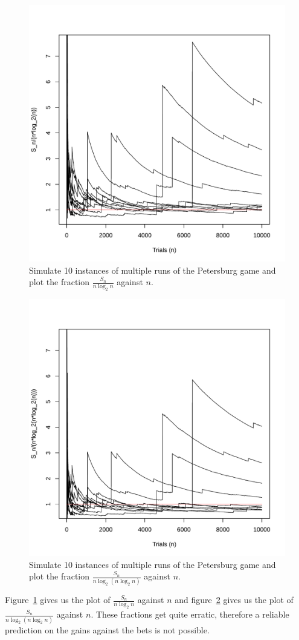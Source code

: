 \documentclass[twoside,a4paper]{article}
\theoremstyle{plain}
\theoremstyle{definition}
\theoremstyle{remark}
\numberwithin{equation}{section}
\DeclareMathOperator{\1}{\mathbbm{1}}
\begin{document}
\begin{figure}
\includegraphics[width=0.70\linewidth]{svg-inkscape/petersburgslow_svg-tex.pdf}
\caption{Simulate 10 instances of multiple runs of the Petersburg game and plot the fraction $\frac{S_n}{n\log_2 n}$ against $n$.}
\label{fig:petersburgslow}
\end{figure}

\begin{figure}
\includegraphics[width=0.70\linewidth]{svg-inkscape/petersburgfast_svg-tex.pdf}
\caption{Simulate 10 instances of multiple runs of the Petersburg game and plot the fraction $\frac{S_n}{n\log_2 (n\log_2 n)}$ against $n$.}
\label{fig:petersburgfast}
\end{figure}

Figure~\ref{fig:petersburgslow} gives us the plot of $\frac{S_n}{n\log_2 n}$ against $n$ and figure~\ref{fig:petersburgfast} gives us the plot of $\frac{S_n}{n\log_2(n\log_2n)}$ against $n$. These fractions get quite erratic, therefore a reliable prediction on the gains against the bets is not possible. 
\end{document}
